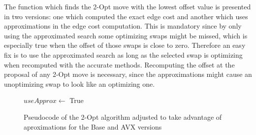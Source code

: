The function which finds the 2-Opt move with the lowest offset value is presented in two versions: one which computed the exact edge cost and another which uses approximations in the edge cost computation.
This is mandatory since by only using the approximated search some optimizing swaps might be missed, which is especially true when the offset of those swaps is close to zero.
Therefore an easy fix is to use the approximated search as long as the selected swap is optimizing when recomputed with the accurate methods.
Recomputing the offset at the proposal of any 2-Opt move is necessary, since the approximations might cause an unoptimizing swap to look like an optimizing one.

\begin{figure}[htbp]
    \begin{algorithm}[H]
        \BlankLine
        $useApprox \gets$ True \\
    \end{algorithm}
    \caption{Pseudocode of the 2-Opt algorithm adjusted to take advantage of aproximations for the Base and AVX versions} \label{fig:2OptPseudocodeApprox}
\end{figure}

